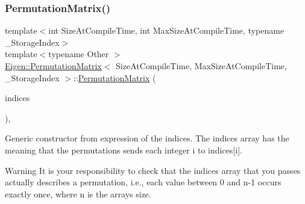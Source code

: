 \subsubsection{\texorpdfstring{PermutationMatrix()}{PermutationMatrix()}\hspace{0.1cm}{\footnotesize\ttfamily [4/5]}}
{\footnotesize\ttfamily template$<$int Size\+At\+Compile\+Time, int Max\+Size\+At\+Compile\+Time, typename \+\_\+\+Storage\+Index$>$ \\
template$<$typename Other $>$ \\
\mbox{\hyperlink{class_eigen_1_1_permutation_matrix}{Eigen\+::\+Permutation\+Matrix}}$<$ Size\+At\+Compile\+Time, Max\+Size\+At\+Compile\+Time, \+\_\+\+Storage\+Index $>$\+::\mbox{\hyperlink{class_eigen_1_1_permutation_matrix}{Permutation\+Matrix}} (\begin{DoxyParamCaption}\item[{const \mbox{\hyperlink{class_eigen_1_1_matrix_base}{Matrix\+Base}}$<$ Other $>$ \&}]{indices }\end{DoxyParamCaption})\hspace{0.3cm}{\ttfamily [inline]}, {\ttfamily [explicit]}}

Generic constructor from expression of the indices. The indices array has the meaning that the permutations sends each integer i to indices\mbox{[}i\mbox{]}.

\begin{DoxyWarning}{Warning}
It is your responsibility to check that the indices array that you passes actually describes a permutation, i.\+e., each value between 0 and n-\/1 occurs exactly once, where n is the array\textquotesingle{}s size. 
\end{DoxyWarning}
\mbox{\label{class_eigen_1_1_permutation_matrix_a0b9a4e51bea9c778a38f6e89db484af4}} 
